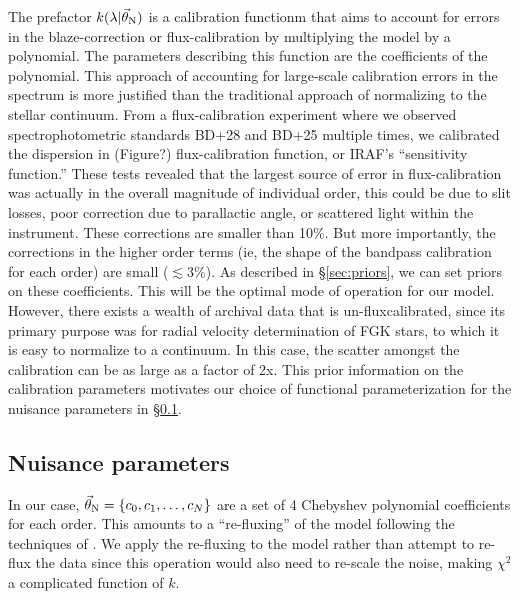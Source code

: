 \documentclass[preprint]{aastex} %
\newcommand{\vt}{\vec{\theta}}
\newcommand{\vN}{\vt_{\rm N}}
\begin{document}
The prefactor $k(\lambda | \vN)$ is a calibration functionm that aims to account for errors in the blaze-correction or flux-calibration by multiplying the model by a polynomial. The parameters describing this function are the coefficients of the polynomial. This approach of accounting for large-scale calibration errors in the spectrum is more justified than the traditional approach of normalizing to the stellar continuum. From a flux-calibration experiment where we observed spectrophotometric standards BD+28 and BD+25 multiple times, we calibrated the dispersion in (Figure?) flux-calibration function, or IRAF's ``sensitivity function.'' These tests revealed that the largest source of error in flux-calibration was actually in the overall magnitude of individual order, this could be due to slit losses, poor correction due to parallactic angle, or scattered light within the instrument. These corrections are smaller than 10\%. But more importantly, the corrections in the higher order terms (ie, the shape of the bandpass calibration for each order) are small ($\lesssim 3\%$). As described in \S\ref{sec:priors}, we can set priors on these coefficients. This will be the optimal mode of operation for our model. However, there exists a wealth of archival data that is un-fluxcalibrated, since its primary purpose was for radial velocity determination of FGK stars, to which it is easy to normalize to a continuum. In this case, the scatter amongst the calibration can be as large as a factor of 2x. This prior information on the calibration parameters motivates our choice of functional parameterization for the nuisance parameters in \S\ref{sec:nuisance}. 

\subsection{Nuisance parameters}
\label{sec:nuisance}
In our case, $\vN = \{c_0, c_1, \ldots, c_N\}$ are a set of 4 Chebyshev polynomial coefficients for each order. This amounts to a ``re-fluxing'' of the model following the techniques of \citet{elh+06}. We apply the re-fluxing to the model rather than attempt to re-flux the data since this operation would also need to re-scale the noise, making $\chi^2$ a complicated function of $k$.
\end{document}
